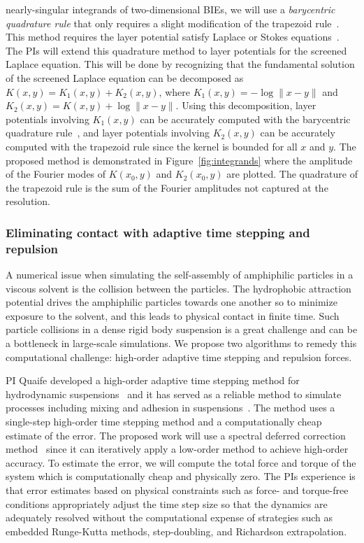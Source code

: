 nearly-singular integrands of two-dimensional BIEs, we will use a {\em
barycentric quadrature rule} that only requires a slight modification of
the trapezoid rule~\cite{ioa-pap-per1991}. This method requires the
layer potential satisfy Laplace or Stokes
equations~\cite{bar-wu-vee2015, chi-moo-qua2020}. The PIs will extend
this quadrature method to layer potentials for the screened Laplace
equation. This will be done by recognizing that the fundamental solution
of the screened Laplace equation can be decomposed as $K(x,y) = K_1(x,y)
+ K_2(x,y)$, where $K_1(x,y) = -\log\|x - y\|$ and $K_2(x,y) = K(x,y) +
\log\|x - y\|$. Using this decomposition, layer potentials involving
$K_1(x,y)$ can be accurately computed with the barycentric quadrature
rule~\cite{ioa-pap-per1991}, and layer potentials involving $K_2(x,y)$
can be accurately computed with the trapezoid rule since the kernel is
bounded for all $x$ and $y$. The proposed method is demonstrated in
Figure~\ref{fig:integrands} where the amplitude of the Fourier modes of
$K(x_0,y)$ and $K_2(x_0,y)$ are plotted. The quadrature of the trapezoid
rule is the sum of the Fourier amplitudes not captured at the
resolution.


\subsubsection{Eliminating contact with adaptive time stepping and
repulsion}
\label{subsec:timeStepping}

A numerical issue when simulating the self-assembly of amphiphilic
particles in a viscous solvent is the collision between the
particles. The hydrophobic attraction potential drives the amphiphilic
particles towards one another so to minimize exposure to the solvent,
and this leads to physical contact in finite time. Such particle
collisions in a dense rigid body suspension is a great challenge and can
be a bottleneck in large-scale simulations. We propose two algorithms to
remedy this computational challenge: high-order adaptive time stepping
and repulsion forces.

PI Quaife developed a high-order adaptive time stepping method for
hydrodynamic suspensions~\cite{qua-bir2016} and it has served as a
reliable method to simulate processes including mixing and adhesion in
suspensions~\cite{qua-vee-you2019, kab-qua-bir2017}. The method uses
a single-step high-order time stepping method and a computationally
cheap estimate of the error. The proposed work will use a spectral
deferred correction method~\cite{dut-gre-rok2000} since it can
iteratively apply a low-order method to achieve high-order accuracy. To
estimate the error, we will compute the total force and torque of the
system which is computationally cheap and physically zero. The PIs
experience is that error estimates based on physical constraints such as
force- and torque-free conditions appropriately adjust the time step
size so that the dynamics are adequately resolved without the
computational expense of strategies such as embedded Runge-Kutta
methods, step-doubling, and Richardson extrapolation.

